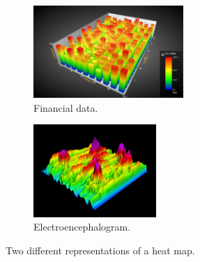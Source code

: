 \documentclass[
	fontsize=11pt
	headlines=2,
	footlines=2,
	parskip=half
]{scrartcl}
\newcommand{\subfigcaptionskip}{\vspace{-10pt}}
\begin{document}
{		\newcommand{\heatmapwidth}{0.4\textwidth}
		\newcommand{\heatmapheight}{3.5cm}
		\begin{figure}[H]
			\centering
			\begin{subfigure}[b]{\heatmapwidth}
                \includegraphics[width=\textwidth,height=\heatmapheight]{images/heat-map-1}
                \caption{Financial data. \protect\footnotemark}
                \label{fig:heat_map_financial}
	        \end{subfigure}
	        \begin{subfigure}[b]{\heatmapwidth}
                \includegraphics[width=\textwidth,height=\heatmapheight]{images/heat-map-2}
                \caption{Electroencephalogram. \protect\footnotemark}
                \label{fig:heat_map_eeg}
	        \end{subfigure}
			\caption{Two different representations of a heat map.}
			\subfigcaptionskip
			\label{fig:heat_maps}
		\end{figure}

}
\end{document}

